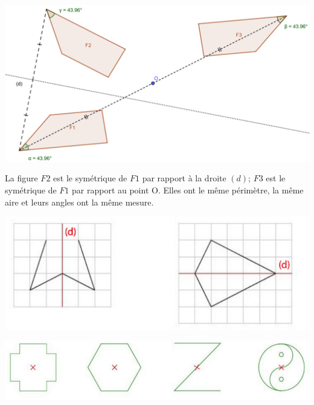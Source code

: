 \documentclass[12pt,a4paper]{article}
\begin{document}
\begin{myex}
	\begin{center}
		\includegraphics[scale=0.2]{sym_figures}
	\end{center}
	
	La figure $F2$ est le symétrique de $F1$ par rapport à la droite $(d)$; $F3$ est le symétrique de $F1$ par rapport au point O.
	Elles ont le même périmètre, la même aire et leurs angles ont la même mesure.
\end{myex}


\begin{myexs}
	\begin{center}
		\includegraphics[scale=0.7]{axes}
	\end{center}
\end{myexs}

\begin{myexs}
	\begin{center}
		\includegraphics[scale=0.6]{centres}
	\end{center}
\end{myexs}
\end{document}
